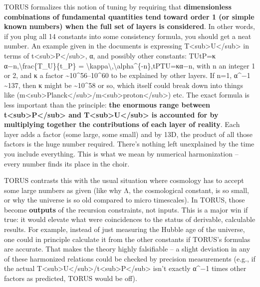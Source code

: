 \documentclass[
]{article}
\begin{document}
TORUS formalizes this notion of tuning by requiring that
\textbf{dimensionless combinations of fundamental quantities tend toward
order 1 (or simple known numbers) when the full set of layers is
considered}\hspace{0pt}. In other words, if you plug all 14 constants
into some consistency formula, you should get a neat number. An example
given in the documents is expressing
T\textless sub\textgreater U\textless/sub\textgreater{} in terms of
t\textless sub\textgreater P\textless/sub\textgreater, α, and possibly
other constants: TUtP=κ α−n,\textbackslash frac\{T\_U\}\{t\_P\} =
\textbackslash kappa\textbackslash,\textbackslash alpha\^{}\{-n\},tP\hspace{0pt}TU\hspace{0pt}\hspace{0pt}=κα−n,
with n an integer 1 or 2, and κ a factor
\textasciitilde10\^{}56--10\^{}60 to be explained by other
layers\hspace{0pt}. If n=1, α\^{}−1 \textasciitilde137, then κ might be
\textasciitilde10\^{}58 or so, which itself could break down into things
like
(m\textless sub\textgreater Planck\textless/sub\textgreater/m\textless sub\textgreater proton\textless/sub\textgreater)
etc. The exact formula is less important than the principle: \textbf{the
enormous range between
t\textless sub\textgreater P\textless/sub\textgreater{} and
T\textless sub\textgreater U\textless/sub\textgreater{} is accounted for
by multiplying together the contributions of each layer of
reality}\hspace{0pt}. Each layer adds a factor (some large, some small)
and by 13D, the product of all those factors is the huge number
required. There's nothing left unexplained by the time you include
everything. This is what we mean by numerical harmonization -- every
number finds its place in the choir.

TORUS contrasts this with the usual situation where cosmology has to
accept some large numbers as given (like why Λ, the cosmological
constant, is so small, or why the universe is so old compared to micro
timescales). In TORUS, those become \textbf{outputs} of the recursion
constraints, not inputs\hspace{0pt}. This is a major win if true: it
would elevate what were coincidences to the status of derivable,
calculable results\hspace{0pt}. For example, instead of just measuring
the Hubble age of the universe, one could in principle calculate it from
the other constants if TORUS's formulas are accurate. That makes the
theory highly falsifiable -- a slight deviation in any of these
harmonized relations could be checked by precision measurements (e.g.,
if the actual
T\textless sub\textgreater U\textless/sub\textgreater/t\textless sub\textgreater P\textless/sub\textgreater{}
isn't exactly α\^{}−1 times other factors as predicted, TORUS would be
off).
\end{document}
